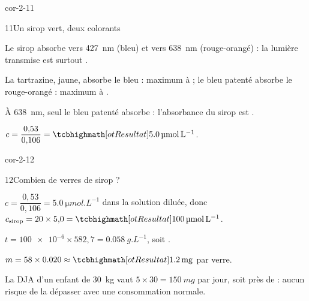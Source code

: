 \begin{blocLivre}{cor-2-11}
\begin{corrige}{11}{Un sirop vert, deux colorants}
\begin{questions}
\item Le sirop absorbe vers \qty{427}{nm} (bleu) et vers \qty{638}{nm} (rouge-orangé) : la lumière transmise est surtout .
\item La tartrazine, jaune, absorbe le bleu : maximum à  ; le bleu patenté absorbe le rouge-orangé : maximum à .
\item À \qty{638}{nm}, seul le bleu patenté absorbe : l'absorbance du sirop est .
\item $c=\dfrac{0{,}53}{0{,}106}=\res{\qty{5,0}{\micro mol.L^{-1}}}$.
\end{questions}
\end{corrige}
\end{blocLivre}
\begin{blocLivre}{cor-2-12}
\begin{corrige}{12}{Combien de verres de sirop ?}
\begin{questions}
\item $c=\dfrac{0{,}53}{0{,}106}=\qty{5,0}{\micro mol.L^{-1}}$ dans la solution diluée, donc $c_\text{sirop}=20\times5{,}0=\res{\qty{100}{\micro mol.L^{-1}}}$.
\item $t=\num{100e-6}\times582{,}7=\qty{0,058}{g.L^{-1}}$, soit .
\item $m=58\times\num{0.020}\approx\res{\qty{1,2}{mg}}$ par verre.
\item La DJA d'un enfant de \qty{30}{kg} vaut $5\times30=\qty{150}{mg}$ par jour, soit près de  : aucun risque de la dépasser
avec une consommation normale.
\end{questions}
\end{corrige}
\end{blocLivre}
